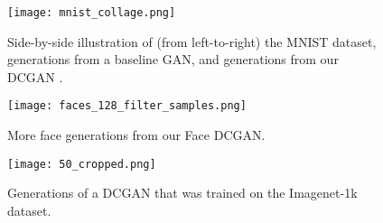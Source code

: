 \documentclass{article} \usepackage{iclr2016_conference,times}
\begin{document}
\begin{figure}[h]
\begin{center}
\texttt{[image: mnist\_collage.png]}
\end{center}
\caption{\label{fig_mnist_collage} Side-by-side illustration of (from left-to-right) the MNIST dataset, generations from a baseline GAN, and generations from our DCGAN .}
\end{figure}

\begin{figure}[h]
\begin{center}
\texttt{[image: faces\_128\_filter\_samples.png]}
\end{center}
\caption{\label{fig_albums} More face generations from our Face DCGAN.}
\end{figure}

\begin{figure}[h]
\begin{center}
\texttt{[image: 50\_cropped.png]}
\end{center}
\caption{\label{fig_imagenet} Generations of a DCGAN that was trained on the Imagenet-1k dataset.}
\end{figure}
\end{document}
